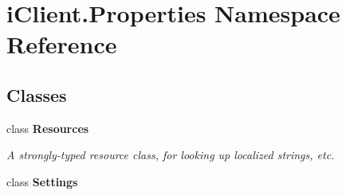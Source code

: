 \hypertarget{namespacei_client_1_1_properties}{}\section{i\+Client.\+Properties Namespace Reference}
\label{namespacei_client_1_1_properties}
\subsection*{Classes}
\begin{DoxyCompactItemize}
\item 
class {\bfseries Resources}
\begin{DoxyCompactList}\small\item\em A strongly-\/typed resource class, for looking up localized strings, etc. \end{DoxyCompactList}\item 
class {\bfseries Settings}
\end{DoxyCompactItemize}
